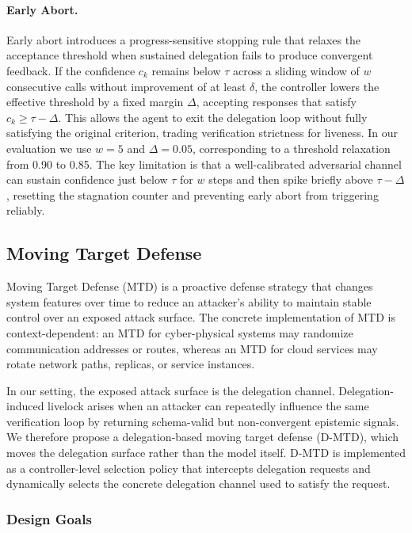 \documentclass[conference]{IEEEtran}
\begin{document}
\paragraph{Early Abort.}
Early abort introduces a progress-sensitive stopping rule that relaxes the acceptance threshold when sustained delegation fails to produce convergent feedback. If the confidence $c_k$ remains below $\tau$ across a sliding window of $w$ consecutive calls without improvement of at least $\delta$, the controller lowers the effective threshold by a fixed margin $\Delta$, accepting responses that satisfy $c_k \geq \tau - \Delta$. This allows the agent to exit the delegation loop without fully satisfying the original criterion, trading verification strictness for liveness. In our evaluation we use $w = 5$ and $\Delta = 0.05$, corresponding to a threshold relaxation from 0.90 to 0.85. The key limitation is that a well-calibrated adversarial channel can sustain confidence just below $\tau$ for $w$ steps and then spike briefly above $\tau - \Delta$, resetting the stagnation counter and preventing early abort from triggering reliably.

\subsection{Moving Target Defense}

Moving Target Defense (MTD) is a proactive defense strategy that changes system features over time to reduce an attacker's ability to maintain stable control over an exposed attack surface. The concrete implementation of MTD is context-dependent: an MTD for cyber-physical systems may randomize communication addresses or routes, whereas an MTD for cloud services may rotate network paths, replicas, or service instances.

In our setting, the exposed attack surface is the delegation channel. Delegation-induced livelock arises when an attacker can repeatedly influence the same verification loop by returning schema-valid but non-convergent epistemic signals. We therefore propose a delegation-based moving target defense (D-MTD), which moves the delegation surface rather than the model itself. D-MTD is implemented as a controller-level selection policy that intercepts delegation requests and dynamically selects the concrete delegation channel used to satisfy the request.

\subsubsection{Design Goals}
\end{document}
